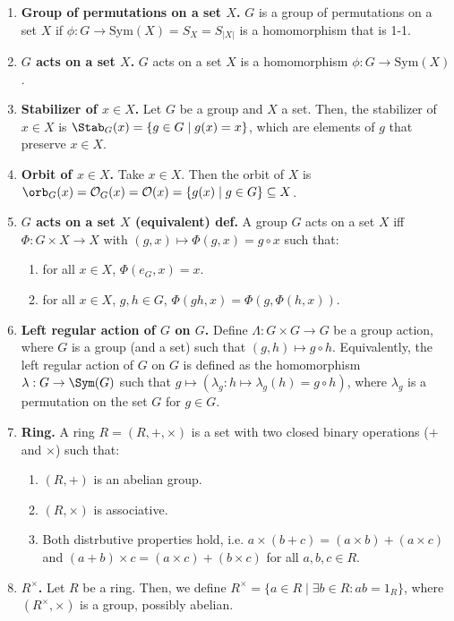 \begin{enumerate}
	\item \textbf{Group of permutations on a set $X$. } $G$ is a group of permutations on a set $X$ if $\phi: G \to \textrm{Sym}(X)=S_X=S_{|X|}$ is a homomorphism that is 1-1. 
	\item \textbf{$G$ acts on a set $X$. } $G$ acts on a set $X$ is a homomorphism $\phi: G \to \textrm{Sym}(X)$. 
	\item \textbf{Stabilizer of $x \in X$. } Let $G$ be a group and $X$ a set. Then, the stabilizer of $x \in X$ is $\Stab_G(x) = \{g \in G \mid g(x)=x\}$, which are elements of $g$ that preserve $x \in X$. 
	\item \textbf{Orbit of $x \in X$. } Take $x \in X$. Then the orbit of $X$ is $\orb_G(x) = \mathcal{O}_G(x) = \mathcal{O}(x) = \{g(x) \mid g \in G\} \subseteq X$. 
	\item \textbf{$G$ acts on a set $X$ (equivalent) def. } A group $G$ acts on a set $X$ iff $\Phi: G \times X \to X$ with $(g,x) \mapsto \Phi(g,x) = g \circ x$ such that: 
	\begin{enumerate}
		\item for all $x \in X$, $\Phi(e_G,x) = x$. 
		\item for all $x \in X$, $g,h \in G$, $\Phi(gh,x) = \Phi(g,\Phi(h,x))$. 
	\end{enumerate}
	\item \textbf{Left regular action of $G$ on $G$. } Define $\Lambda: G \times G \to G$ be a group action, where $G$ is a group (and a set) such that $(g,h) \mapsto g \circ h$. Equivalently, the left regular action of $G$ on $G$ is defined as the homomorphism $\lambda: G \to \Sym(G)$ such that $g \mapsto (\lambda_g: h \mapsto \lambda_g(h) = g \circ h)$, where $\lambda_g$ is a permutation on the set $G$ for $g \in G$. 
	\item \textbf{Ring. } A ring $R = (R,+,\times)$ is a set with two closed binary operations ($+$ and $\times$) such that: 
	\begin{enumerate}
		\item $(R,+)$ is an abelian group. 
		\item $(R,\times)$ is associative. 
		\item Both distrbutive properties hold, i.e. $a \times (b+c) = (a \times b) + (a \times c)$ and $(a+b) \times c = (a \times c) + (b \times c)$ for all $a,b,c \in R$. 
	\end{enumerate}
	\item \textbf{$R^\times$. } Let $R$ be a ring. Then, we define $R^\times = \{a \in R \mid \exists b \in R : ab = 1_R\}$, where $(R^\times, \times)$ is a group, possibly abelian. 

\end{enumerate}
